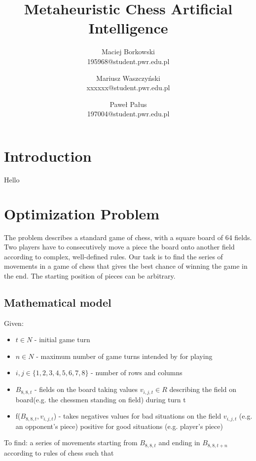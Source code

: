 \documentclass[pdftex]{article}
\date{}
\title{Metaheuristic Chess Artificial Intelligence}
\author{Maciej Borkowski\\ 195968@student.pwr.edu.pl  \and Mariusz Waszczyński\\  xxxxxx@student.pwr.edu.pl \and Paweł Pałus\\ 197004@student.pwr.edu.pl}
\begin{document}
\thispagestyle{empty}

\section{Introduction}
\label{sec:introduction}

Hello

\section{Optimization Problem}
\label{sec:problem}

The problem describes a standard game of chess, with a square board of 64 fields. Two players have to consecutively move a piece the board onto another field according to complex, well-defined rules. Our task is to find the series of movements in a game of chess that gives the best chance of winning the game in the end. The starting position of pieces can be arbitrary.

\subsection{Mathematical model}
\label{sec:model}
Given:
\begin{itemize}
 	\item $t \in N$ - initial game turn 
 	\item $n \in N$ - maximum number of game turns intended by for playing 
 	\item $i,j \in \{1,2,3,4,5,6,7,8\}$ - number of rows and columns
 	\item $B_{8,8,t}$ - fields on the board taking values $v_{i,j,t}\in R$ describing the field on board(e.g. the chessmen standing on field) during turn t
 	\item f($B_{8,8,t},v_{i,j,t}$) - takes negatives values for bad situations on the field $v_{i,j,t}$ (e.g. an opponent's piece) positive for good situations (e.g. player's piece)
\end{itemize}
To find:
\newline
a series of movements starting from $B_{8,8,t}$ and ending in $B_{8,8,t+n}$ according to rules of chess
\newline
such that
\end{document}
